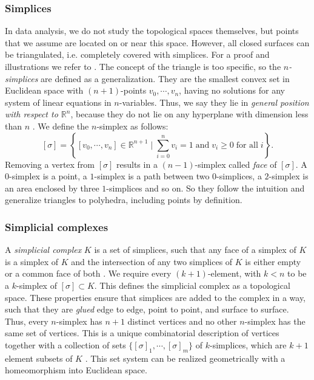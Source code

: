 \documentclass[runningheads,orivec]{llncs}
\begin{document}
\subsubsection{Simplices} In data analysis, we do not study the topological spaces themselves, but points that we assume are located on or near this space. However, all closed surfaces can be triangulated, i.e. completely covered with simplices. For a proof and illustrations we refer to \cite[p.~102]{hatcher2002algebraic,lume}. The concept of the triangle is too specific, so the \emph{$n$-simplices} are defined as a generalization. They are the smallest convex set in Euclidean space with $(n+1)$-points $v_0,\cdots,v_n$, having no solutions for any system of linear equations in $n$-variables. Thus, we say they lie in \emph{general position with respect to $\mathbb{R}^n$}, because they do not lie on any hyperplane with dimension less than $n$ \cite[p.~103]{hatcher2002algebraic}. We define the $n$-simplex as follows:
\begin{equation}
    \label{simplex}
    [\sigma] = \left\{ [v_0,\cdots,v_n] \in \mathbb{R}^{n+1} \; \bigg\vert \; \sum_{i=0}^{n} v_i = 1 \; \text{and} \; v_i \geq 0 \; \text{for all} \; i \right\}.
\end{equation}
Removing a vertex from $[\sigma]$ results in a $(n-1)$-simplex called \emph{face} of $[\sigma]$. A $0$-simplex is a point, a $1$-simplex is a path between two $0$-simplices, a $2$-simplex is an area enclosed by three $1$-simplices and so on. So they follow the intuition and generalize triangles to polyhedra, including points by definition.


\subsubsection{Simplicial complexes} A \emph{simplicial complex} $K$ is a set of simplices, such that any face of a simplex of $K$ is a simplex of $K$ and the intersection of any two simplices of $K$ is either empty or a common face of both \cite[p.~11]{boissonnat2018geometric}. We require every $(k+1)$-element, with $k < n$ to be a $k$-simplex of $[\sigma] \subset K$. This defines the simplicial complex as a topological space. These properties ensure that simplices are added to the complex in a way, such that they are \emph{glued} edge to edge, point to point, and surface to surface. Thus, every $n$-simplex has $n+1$ distinct vertices and no other $n$-simplex has the same set of vertices. This is a unique combinatorial description of vertices together with a collection of sets $\{[\sigma]_1, \cdots, [\sigma]_m\}$ of $k$-simplices, which are $k+1$ element subsets of $K$ \cite[p.~107]{hatcher2002algebraic}. This set system can be realized geometrically with a homeomorphism into Euclidean space.
\end{document}
